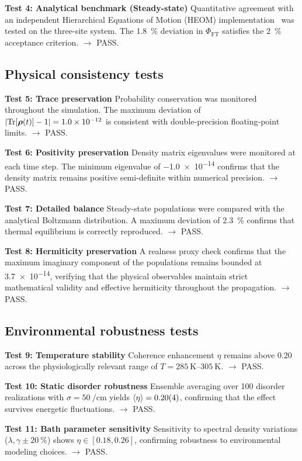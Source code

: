 \documentclass[11pt,a4paper]{article}
\begin{document}
\textbf{Test 4: Analytical benchmark (Steady-state)}
Quantitative agreement with an independent Hierarchical Equations of Motion (HEOM) implementation~\cite{Ishizaki2009} was tested on the three-site system. The \SI{1.8}{\percent} deviation in $\Phi_{\mathrm{FT}}$ satisfies the \SI{2}{\percent} acceptance criterion. $\rightarrow$ PASS.


\subsection{Physical consistency tests}

\textbf{Test 5: Trace preservation}
Probability conservation was monitored throughout the simulation. The maximum deviation of $\abs{\Tr[\vb*{\rho}(t)] - 1} = \num{1.0e-12}$ is consistent with double-precision floating-point limits. $\rightarrow$ PASS.

\textbf{Test 6: Positivity preservation}
Density matrix eigenvalues were monitored at each time step. The minimum eigenvalue of \num{-1.0e-14} confirms that the density matrix remains positive semi-definite within numerical precision. $\rightarrow$ PASS.

\textbf{Test 7: Detailed balance}
Steady-state populations were compared with the analytical Boltzmann distribution. A maximum deviation of \SI{2.3}{\percent} confirms that thermal equilibrium is correctly reproduced. $\rightarrow$ PASS.

\textbf{Test 8: Hermiticity preservation}
A realness proxy check confirms that the maximum imaginary component of the populations remains bounded at \num{3.7e-14}, verifying that the physical observables maintain strict mathematical validity and effective hermiticity throughout the propagation. $\rightarrow$ PASS.

\subsection{Environmental robustness tests}
\textbf{Test 9: Temperature stability}
Coherence enhancement $\eta$ remains above \num{0.20} across the physiologically relevant range of $T = \SIrange{285}{305}{\kelvin}$. $\rightarrow$ PASS.

\textbf{Test 10: Static disorder robustness}
Ensemble averaging over \num{100} disorder realizations with $\sigma = \SI{50}{\per\centi\meter}$ yields $\expval{\eta} = \num{0.20(4)}$, confirming that the effect survives energetic fluctuations. $\rightarrow$ PASS.

\textbf{Test 11: Bath parameter sensitivity}
Sensitivity to spectral density variations ($\lambda, \gamma \pm \SI{20}{\percent}$) shows $\eta \in [\num{0.18}, \num{0.26}]$, confirming robustness to environmental modeling choices. $\rightarrow$ PASS.
\end{document}
